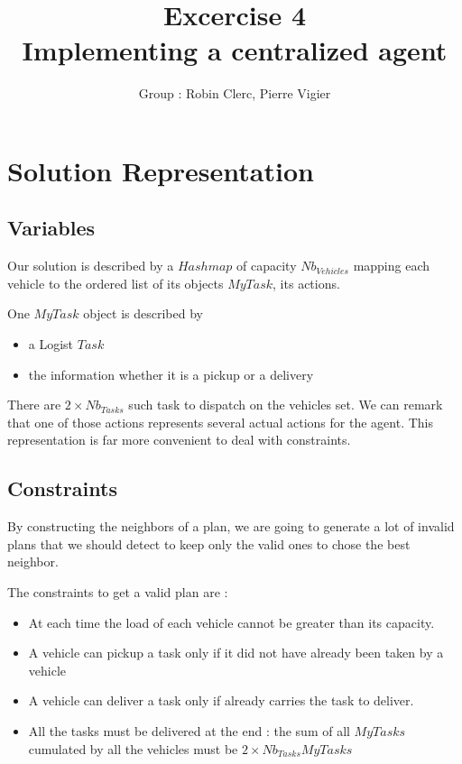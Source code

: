 \documentclass[11pt]{article}
\title{\bf Excercise 4\\ Implementing a centralized agent}
\author{Group \textnumero 3 : Robin Clerc, Pierre Vigier}
\begin{document}
\maketitle

\section{Solution Representation}

\subsection{Variables}
Our solution is described by a $Hashmap$ of capacity $Nb_{Vehicles}$ mapping each vehicle to the ordered list of its objects $MyTask$, its actions.

One $MyTask$ object is described by
\begin{itemize}
    \item a Logist $Task$
    \item the information whether it is a pickup or a delivery
\end{itemize}
There are $2 \times Nb_{Tasks}$ such task to dispatch on the vehicles set. We can remark that one of those actions represents several actual actions for the agent. This representation is far more convenient to deal with constraints.

\subsection{Constraints}

By constructing the neighbors of a plan, we are going to generate a lot of invalid plans that we should detect to keep only the valid ones to chose the best neighbor.

The constraints to get a valid plan are :
\begin{itemize}
    \item At each time the load of each vehicle cannot be greater than its capacity.
    \item A vehicle can pickup a task only if it did not have already been taken by a vehicle
    \item A vehicle can deliver a task only if already carries the task to deliver.
    \item All the tasks must be delivered at the end : the sum of all $MyTasks$ cumulated by all the vehicles must be $2 \times Nb_{Tasks} MyTasks$
\end{itemize}
\end{document}
